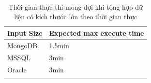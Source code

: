 \begin{longtable}{|l|l|}
\hline
Input   Size & Expected max   execute time \\ \hline
\endfirsthead
%
\endhead
%
MongoDB      & 1.5min                      \\ \hline
MSSQL        & 3min                        \\ \hline
Oracle       & 3min                        \\ \hline
\caption{Thời gian thực thi mong đợi khi tổng hợp dữ liệu có kích thước lớn theo thời gian thực}
\label{tab:stream-time-eval}\\
\end{longtable}